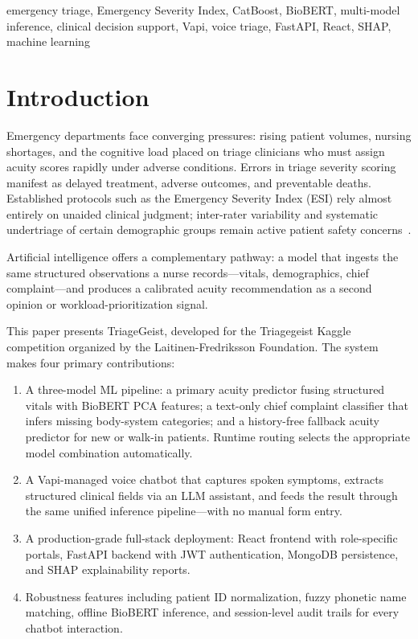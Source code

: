 \documentclass[conference]{IEEEtran}
\begin{document}
\begin{IEEEkeywords}
emergency triage, Emergency Severity Index, CatBoost, BioBERT, multi-model inference, clinical decision support, Vapi, voice triage, FastAPI, React, SHAP, machine learning
\end{IEEEkeywords}

\section{Introduction}

Emergency departments face converging pressures: rising patient volumes, nursing shortages, and the cognitive load placed on triage clinicians who must assign acuity scores rapidly under adverse conditions. Errors in triage severity scoring manifest as delayed treatment, adverse outcomes, and preventable deaths. Established protocols such as the Emergency Severity Index (ESI) rely almost entirely on unaided clinical judgment; inter-rater variability and systematic undertriage of certain demographic groups remain active patient safety concerns~\cite{gilboy2012}.

Artificial intelligence offers a complementary pathway: a model that ingests the same structured observations a nurse records---vitals, demographics, chief complaint---and produces a calibrated acuity recommendation as a second opinion or workload-prioritization signal.

This paper presents TriageGeist, developed for the Triagegeist Kaggle competition organized by the Laitinen-Fredriksson Foundation. The system makes four primary contributions:

\begin{enumerate}
\item A three-model ML pipeline: a primary acuity predictor fusing structured vitals with BioBERT PCA features; a text-only chief complaint classifier that infers missing body-system categories; and a history-free fallback acuity predictor for new or walk-in patients. Runtime routing selects the appropriate model combination automatically.
\item A Vapi-managed voice chatbot that captures spoken symptoms, extracts structured clinical fields via an LLM assistant, and feeds the result through the same unified inference pipeline---with no manual form entry.
\item A production-grade full-stack deployment: React frontend with role-specific portals, FastAPI backend with JWT authentication, MongoDB persistence, and SHAP explainability reports.
\item Robustness features including patient ID normalization, fuzzy phonetic name matching, offline BioBERT inference, and session-level audit trails for every chatbot interaction.
\end{enumerate}
\end{document}

